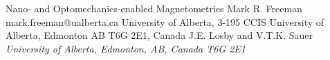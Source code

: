 \begin{conf-abstract}[]
{Nano- and Optomechanics-enabled Magnetometries}
{\color{blue} Mark R. Freeman}
{mark.freeman@ualberta.ca}
{University of Alberta, 3-195 CCIS University of Alberta, Edmonton AB T6G 2E1, Canada}
{{\color{blue}J.E. Losby and V.T.K. Sauer}\\ \textit{University of Alberta, Edmonton, AB, Canada T6G 2E1}\\ 
\decofourleft \decofourright}





\printbibliography[heading=none]

\end{conf-abstract}
